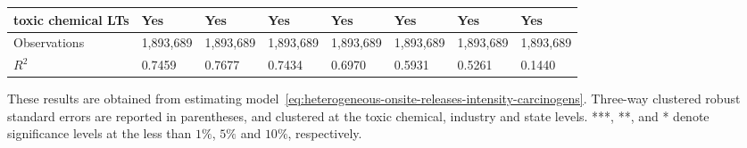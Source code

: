 \begin{table}[H]
{\begin{tabular}{@{}llllllll@{}}
            toxic chemical LTs              & Yes       & Yes           & Yes       & Yes          & Yes             & Yes           & Yes                 \\ \midrule \midrule
            Observations                    & 1,893,689 & 1,893,689     & 1,893,689 & 1,893,689    & 1,893,689       & 1,893,689     & 1,893,689           \\
            $R^2$                           & 0.7459    & 0.7677        & 0.7434    & 0.6970       & 0.5931          & 0.5261        & 0.1440              \\ \bottomrule\bottomrule
        \end{tabular}%
    }
    \begin{minipage}{18cm}
        \vspace{0.05in}
        These results are obtained from estimating model~\ref{eq:heterogeneous-onsite-releases-intensity-carcinogens}. Three-way clustered robust standard errors are reported in parentheses, and clustered at the toxic chemical, industry and state levels. ***, **, and * denote significance levels at the less than $1\%$, $5\%$ and $10\%$, respectively.
    \end{minipage}
\end{table}